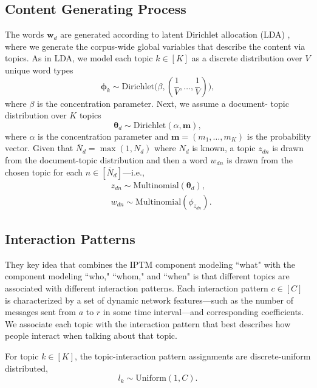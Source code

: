 \documentclass{article}
\begin{document}
\subsection{Content Generating Process}\label{subsec:Content generating process}

The words $\boldsymbol{w}_d$ are generated according to latent Dirichlet allocation (LDA) \cite{Blei2003}, where we generate the corpus-wide global variables that describe the content via topics. As in LDA, we model each topic $k\in [K]$ as a discrete distribution over $V$ unique word types 
\begin{equation}
\boldsymbol{\phi}_k \sim \mbox{Dirichlet}\Big(\beta, (\frac{1}{V},\ldots,\frac{1}{V})\Big),
\end{equation}
where $\beta$ is the concentration parameter. Next, we assume a document- topic distribution over $K$ topics\\
\begin{equation}
\boldsymbol{\theta}_d \sim \mbox{Dirichlet}(\alpha, \boldsymbol{m}),
\end{equation}
where $\alpha$ is the concentration parameter and $\boldsymbol{m}=(m_1,\ldots,m_K)$ is the probability vector. Given that $\bar N_d = \max(1, N_d)$ where $N_d$ is known, a topic $z_{dn}$ is drawn from the document-topic distribution and then a word $w_{dn}$ is drawn from the chosen topic for each $n \in [\bar N_d]$---i.e.,
\begin{equation}
\begin{aligned}
&z_{dn} \sim \mbox{Multinomial}(\boldsymbol{\theta}_d),\\
&w_{dn} \sim\mbox{Multinomial} (\phi_{z_{dn}}).
\end{aligned}
\end{equation}
\subsection{Interaction Patterns}\label{subsec:Interaction patterns}
They key idea that combines the IPTM component modeling ``what" with
the component modeling ``who," ``whom," and ``when" is that different
topics are associated with different interaction patterns.  Each interaction pattern $c \in [C]$ is characterized by a set of dynamic network features---such as the number of messages sent from $a$ to $r$ in some time interval---and corresponding coefficients. We associate each topic with the interaction pattern that best describes how people interact when talking about that topic. 

For topic $k \in [K]$, the topic-interaction pattern assignments are discrete-uniform distributed,
\begin{equation}
l_k\sim \mbox{Uniform}(1, C).
\end{equation}
\end{document}
